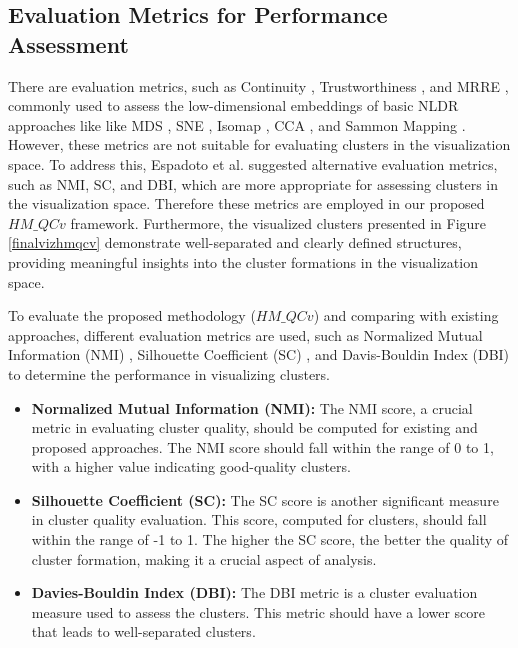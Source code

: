\subsection{Evaluation Metrics for Performance Assessment}

There are evaluation metrics, such as Continuity \cite{venna2006local}, Trustworthiness \cite{venna2006local}, and MRRE \cite{lee2009quality}, commonly used to assess the low-dimensional embeddings of basic NLDR approaches like like MDS \cite{hout2013multidimensional}, SNE \cite{sne_paper}, Isomap \cite{tenenbaum2000global}, CCA \cite{demartines1995cca}, and Sammon Mapping \cite{sammon1969nonlinear}. However, these metrics are not suitable for evaluating clusters in the visualization space. To address this, Espadoto et al. \cite{espadoto2019toward} suggested alternative evaluation metrics, such as NMI, SC, and DBI, which are more appropriate for assessing clusters in the visualization space. Therefore these metrics are employed in our proposed $HM\_QCv$ framework. Furthermore, the visualized clusters presented in Figure \ref{finalvizhmqcv} demonstrate well-separated and clearly defined structures, providing meaningful insights into the cluster formations in the visualization space.



To evaluate the proposed methodology ($HM\_QCv$) and comparing with existing approaches, different evaluation metrics are used, such as Normalized Mutual Information (NMI) \cite{estevez2009normalized}, Silhouette Coefficient (SC) \cite{rousseeuw1987silhouettes}, and Davis-Bouldin Index (DBI) \cite{davies1979} to determine the performance in visualizing clusters.




\begin{itemize}
    \item \textbf{Normalized Mutual Information (NMI):} The NMI score, a crucial metric in evaluating cluster quality, should be computed for existing and proposed approaches. The NMI score should fall within the range of 0 to 1, with a higher value indicating good-quality clusters.
    
    \item \textbf{Silhouette Coefficient (SC):} The SC score is another significant measure in cluster quality evaluation. This score, computed for clusters, should fall within the range of -1 to 1. The higher the SC score, the better the quality of cluster formation, making it a crucial aspect of analysis.
    
    \item \textbf{Davies-Bouldin Index (DBI):} The DBI metric is a cluster evaluation measure used to assess the clusters. This metric should have a lower score that leads to well-separated clusters. 

\end{itemize}

